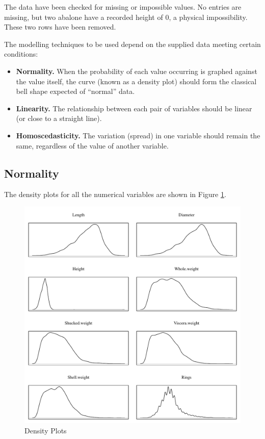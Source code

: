 \documentclass[11pt, a4paper]{article}
\begin{document}
    The data have been checked for missing or impossible values. No entries are missing, but two abalone have a recorded height of 0, a physical impossibility. These two rows have been removed.

    The modelling techniques to be used depend on the supplied data meeting certain conditions:

    \begin{itemize}
        \item \textbf{Normality.} When the probability of each value occurring is graphed against the value itself, the curve (known as a density plot) should form the classical bell shape expected of ``normal'' data.
        \item \textbf{Linearity.} The relationship between each pair of variables should be linear (or close to a straight line).
        \item \textbf{Homoscedasticity.} The variation (spread) in one variable should remain the same, regardless of the value of another variable. 
    \end{itemize}

    \subsection{Normality}

    The density plots for all the numerical variables are shown in Figure \ref{density}.

    \begin{figure}[ht]
        \centering
        \includegraphics[width=\textwidth]{1.4.pdf}
        \caption{Density Plots}
        \label{density}
    \end{figure}
\end{document}
